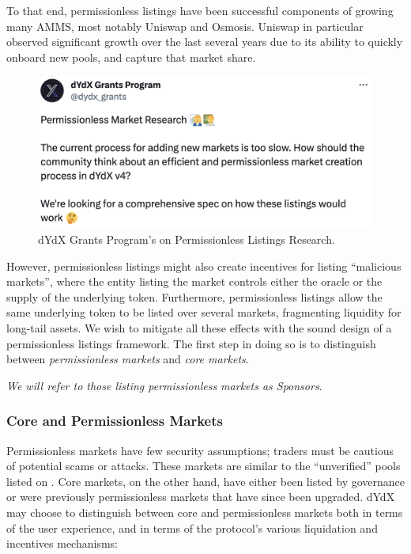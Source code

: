         To that end, permissionless listings have been successful components of growing many AMMS, most notably Uniswap and Osmosis. Uniswap in particular observed significant growth over the last several years due to its ability to quickly onboard new pools, and capture that market share.

        \begin{figure}[htp]
            \centering
            \includegraphics[width=0.7\linewidth]{figs/dgp_pl.png}
            \captionsetup{width=0.7\linewidth}
            \caption{dYdX Grants Program's  on Permissionless Listings Research.}
            \label{fig:dgp_tweet}
        \end{figure}
        
        However, permissionless listings might also create incentives for listing ``malicious markets'', where the entity listing the market controls either the oracle or the supply of the underlying token. Furthermore, permissionless listings allow the same underlying token to be listed over several markets, fragmenting liquidity for long-tail assets. We wish to mitigate all these effects with the sound design of a permissionless listings framework. The first step in doing so is to distinguish between \textit{permissionless markets} and \textit{core markets}. 

        \textit{We will refer to those listing permissionless markets as Sponsors}.
            
        \subsubsection{Core and Permissionless Markets}

            Permissionless markets have few security assumptions; traders must be cautious of potential scams or attacks. These markets are similar to the ``unverified'' pools listed on . Core markets, on the other hand, have either been listed by governance or were previously permissionless markets that have since been upgraded. dYdX may choose to distinguish between core and permissionless markets both in terms of the user experience, and in terms of the protocol's various liquidation and incentives mechanisms:
    
